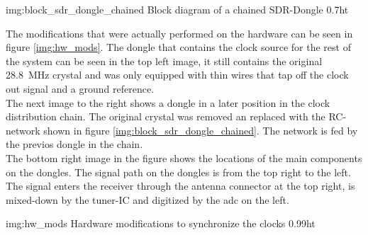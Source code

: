              {img:block_sdr_dongle_chained}
             {Block diagram of a chained SDR-Dongle}
             {0.7}{ht}

The modifications that were actually performed on the
hardware can be seen in figure \ref{img:hw_mods}.
The dongle that contains the clock source for
the rest of the system can be seen in the top left
image, it still contains the original
\SI{28.8}{\mega\hertz} crystal and was only equipped
with thin wires that tap off the clock out signal
and a ground reference. \\

The next image to the right shows a dongle
in a later position in the clock distribution chain.
The original crystal was removed an replaced with
the RC-network shown in figure \ref{img:block_sdr_dongle_chained}.
The network is fed by the previos dongle in the chain. \\

The bottom right image in the figure shows the
locations of the main components on the dongles.
The signal path on the dongles is from the top right
to the left.
The signal enters the receiver through the antenna
connector at the top right, is mixed-down by the
tuner-IC and digitized by the \acrshort{adc} on the left.

             {img:hw_mods}
             {Hardware modifications to synchronize the clocks}
             {0.99}{ht}
